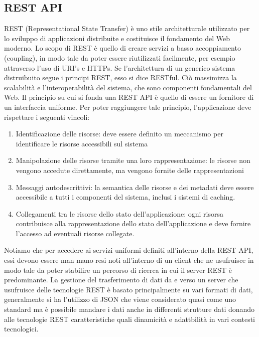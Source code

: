 \subsection{REST API}
REST (Representational State Transfer) è uno stile architetturale utilizzato per lo sviluppo
di applicazioni distribuite e costituisce il fondamento del Web moderno.
Lo scopo di REST è quello di creare servizi a basso accoppiamento (coupling), in modo
tale da poter essere riutilizzati facilmente, per esempio attraverso l'uso di URI's e HTTPs.
Se l'architettura di un generico sistema distruibuito segue i principi REST, esso si dice
RESTful. Ciò massimizza la scalabilità e l'interoperabilità del sistema, che sono
componenti fondamentali del Web. Il principio su cui si fonda una REST API è quello di essere un fornitore di un interfaccia uniforme. Per poter raggiungere tale principio, l'applicazione deve rispettare i seguenti vincoli: 
\begin{enumerate}
    \item Identificazione delle risorse: deve essere definito un meccanismo per identificare le risorse accessibili sul sistema
    \item Manipolazione delle risorse tramite una loro rappresentazione: le risorse non vengono accedute direttamente, ma vengono fornite delle rappresentazioni 
    \item Messaggi autodescrittivi: la semantica delle risorse e dei metadati deve essere accessibile a tutti i componenti del sistema, inclusi i sistemi di caching. 
    \item Collegamenti tra le risorse dello stato dell'applicazione: ogni risorsa contribuisce alla rappresentazione dello stato dell’applicazione e deve fornire l’accesso ad eventuali risorse collegate.
\end{enumerate}
Notiamo che per accedere ai servizi uniformi definiti all'interno della REST API, essi devono essere man mano resi noti all'interno di un client che ne usufruisce in modo tale da poter stabilire un percorso di ricerca in cui il server REST è predominante. La gestione del trasferimento di dati da e verso un server che usufruisce delle tecnologie REST è basato principalmente su vari formati di dati, generalmente si ha l'utilizzo di JSON che viene considerato quasi come uno standard ma è possibile mandare i dati anche in differenti strutture dati donando alle tecnologie REST caratteristiche quali dinamicità e adattbilità in vari contesti tecnologici.
